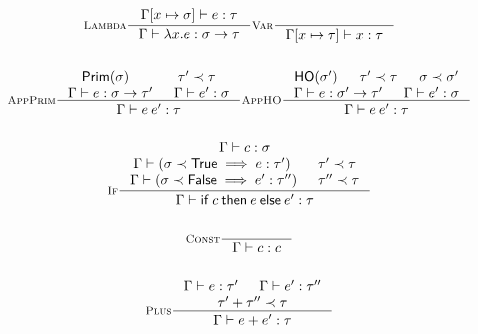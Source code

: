 \documentclass{article}
\newcommand{\judges}{\vdash}
\newcommand{\subtype}{\prec}
\begin{document}
\begin{figure}
\begin{gather*}
  \inference[\textsc{Lambda}]{%
    \Gamma[x \mapsto \sigma] \judges e : \tau
  }{%
    \Gamma \judges \lambda x.e : \sigma \rightarrow \tau
  }
  \inference[\textsc{Var}]{%
  }{%
    \Gamma[x \mapsto \tau] \judges x : \tau
  }
  \\ \\
  \inference[\textsc{AppPrim}]{%
    \mathsf{Prim}(\sigma) & \tau' \subtype \tau \\
    \Gamma \judges e : \sigma \rightarrow \tau' &
    \Gamma \judges e' : \sigma
  }{%
    \Gamma \judges e\:e' : \tau
  }
  \inference[\textsc{AppHO}]{%
    \mathsf{HO}(\sigma') & \tau' \subtype \tau & \sigma \subtype \sigma' \\
    \Gamma \judges e : \sigma' \rightarrow \tau' &
    \Gamma \judges e' : \sigma
  }{%
    \Gamma \judges e\:e' : \tau
  }
  \\ \\
  \inference[\textsc{If}]{%
    \Gamma \judges c : \sigma \\
    \Gamma \judges (\sigma \subtype \mathsf{True} \implies e : \tau') & \tau' \subtype \tau \\
    \Gamma \judges (\sigma \subtype \mathsf{False} \implies e' : \tau'') & \tau'' \subtype \tau
  }{%
    \Gamma \judges \mathsf{if}\:c\:\mathsf{then}\:e\:\mathsf{else}\:e' : \tau
  }
  \\ \\
  \inference[\textsc{Const}]{%
  }{%
    \Gamma \judges c : c
  }
  \\ \\
  \inference[\textsc{Plus}]{%
    \Gamma \judges e : \tau' & \Gamma \judges e' : \tau'' \\
    \tau' + \tau'' \subtype \tau
  }{%
    \Gamma \judges e + e' : \tau
  }
\end{gather*}
\end{figure}
\end{document}

